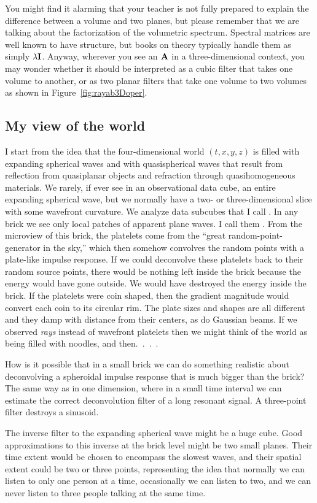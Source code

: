 \par
You might find it alarming
that your teacher is not fully prepared
to explain the difference between a volume and two planes,
but please remember that we are talking about
the factorization of the volumetric spectrum.
Spectral matrices are well known to have structure,
but books on theory typically handle them as simply $\lambda \bold I$.
Anyway, wherever you see an $\bold A$ in a three-dimensional context,
you may wonder whether it should be interpreted as a cubic filter
that takes one volume to another,
or as two planar filters
that take one volume to two volumes
as shown in Figure~\ref{fig:rayab3Doper}.

\subsection{My view of the world}
\par
I start from the idea that the four-dimensional world $(t,x,y,z)$
is filled with expanding spherical waves and with quasispherical waves
that result from reflection from quasiplanar objects
and refraction through quasihomogeneous materials.
We rarely, if ever see
in an observational data cube,
an entire expanding spherical wave,
but we normally have a two- or three-dimensional slice
with some wavefront curvature.
We analyze data subcubes that I call .
In any brick we see only local patches of apparent plane waves.
I call them .
From the microview of this brick,
the platelets come from the ``great random-point-generator in the sky,''
which then somehow convolves the random points
with a plate-like impulse response.
If we could deconvolve these platelets back to their random source points,
there would be nothing left inside the brick
because the energy would have gone outside.
We would have destroyed the energy inside the brick.
If the platelets were coin shaped,
then the gradient magnitude would convert each coin to its circular rim.
The plate sizes and shapes are all different
and they damp with distance from their centers, as do Gaussian beams.
If we observed {\it rays} instead of wavefront platelets
then we might think of the world as being filled with noodles,
and then.\ .\ .\ .
\par
How is it possible that in a small brick we can do something realistic
about deconvolving a spheroidal impulse response
that is much bigger than the brick?
The same way as in one dimension,
where
in a small time interval we can estimate the correct deconvolution filter
of a long resonant signal.
A three-point filter destroys a sinusoid.
\par
The inverse filter to the expanding spherical wave might be a huge cube.
Good approximations to this inverse at the brick level
might be two small planes.
Their time extent would be chosen to encompass the slowest waves,
and their spatial extent could be two or three points,
representing
the idea that normally we can listen to only one person at a time,
occasionally we can listen to two,
and we can never listen to three people talking at the same time.

